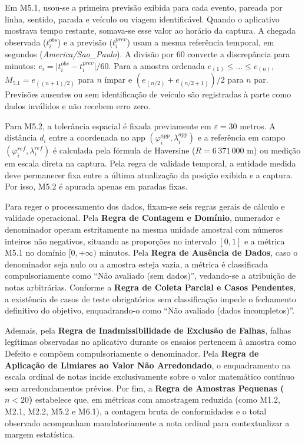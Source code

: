 \documentclass[11pt,a4paper]{article}
\begin{document}
Em M5.1, usou-se a primeira previsão exibida para cada evento, pareada por linha, sentido, parada e veículo ou viagem identificável. Quando o aplicativo mostrava tempo restante, somava-se esse valor ao horário da captura. A chegada observada ($t_i^{obs}$) e a previsão ($t_i^{prev}$) usam a mesma referência temporal, em segundos (\textit{America/Sao\_Paulo}). A divisão por 60 converte a discrepância para minutos: $e_i = \lvert t^{obs}_i - t^{prev}_i \rvert / 60$. Para a amostra ordenada $e_{(1)} \le \dots \le e_{(n)}$, $M_{5.1} = e_{((n+1)/2)}$ para $n$ ímpar e $(e_{(n/2)} + e_{(n/2+1)})/2$ para $n$ par. Previsões ausentes ou sem identificação de veículo são registradas à parte como dados inválidos e não recebem erro zero.

Para M5.2, a tolerância espacial é fixada previamente em $\varepsilon = 30$ metros. A distância $d_i$ entre a coordenada no app $(\varphi_i^{app}, \lambda_i^{app})$ e a referência em campo $(\varphi_i^{ref}, \lambda_i^{ref})$ é calculada pela fórmula de Haversine ($R = 6\,371\,000$ m) ou medição em escala direta na captura. Pela regra de validade temporal, a entidade medida deve permanecer fixa entre a última atualização da posição exibida e a captura. Por isso, M5.2 é apurada apenas em paradas fixas.

Para reger o processamento dos dados, fixam-se seis regras gerais de cálculo e validade operacional. Pela \textbf{Regra de Contagem e Domínio}, numerador e denominador operam estritamente na mesma unidade amostral com números inteiros não negativos, situando as proporções no intervalo $[0, 1]$ e a métrica M5.1 no domínio $[0, +\infty)$ minutos. Pela \textbf{Regra de Ausência de Dados}, caso o denominador seja nulo ou a amostra esteja vazia, a métrica é classificada compulsoriamente como ``Não avaliado (sem dados)'', vedando-se a atribuição de notas arbitrárias. Conforme a \textbf{Regra de Coleta Parcial e Casos Pendentes}, a existência de casos de teste obrigatórios sem classificação impede o fechamento definitivo do objetivo, enquadrando-o como ``Não avaliado (dados incompletos)''.

Ademais, pela \textbf{Regra de Inadmissibilidade de Exclusão de Falhas}, falhas legítimas observadas no aplicativo durante os ensaios pertencem à amostra como Defeito e compõem compulsoriamente o denominador. Pela \textbf{Regra de Aplicação de Limiares ao Valor Não Arredondado}, o enquadramento na escala ordinal de notas incide exclusivamente sobre o valor matemático contínuo sem arredondamentos prévios. Por fim, a \textbf{Regra de Amostras Pequenas ($n < 20$)} estabelece que, em métricas com amostragem reduzida (como M1.2, M2.1, M2.2, M5.2 e M6.1), a contagem bruta de conformidades e o total observado acompanham mandatoriamente a nota ordinal para contextualizar a margem estatística.
\end{document}
